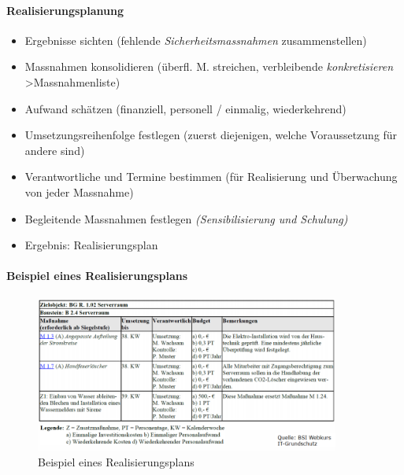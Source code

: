 \documentclass[10pt,a4paper]{article}
\begin{document}
\paragraph*{Realisierungsplanung}
\begin{itemize}[noitemsep,topsep=0pt,leftmargin=*]
    \item Ergebnisse sichten (fehlende
    \textsl{Sicherheitsmassnahmen} zusammenstellen)
    \item Massnahmen konsolidieren (überfl. M. streichen,
    verbleibende \textsl{konkretisieren} \textgreater Massnahmenliste)
    \item Aufwand schätzen (finanziell, personell /
    einmalig, wiederkehrend)
    \item Umsetzungsreihenfolge festlegen (zuerst diejenigen, welche Voraussetzung für andere sind)
    \item Verantwortliche und Termine bestimmen (für
    Realisierung und Überwachung von jeder
    Massnahme)
    \item Begleitende Massnahmen festlegen
    \textsl{(Sensibilisierung und Schulung)}
    \item Ergebnis: Realisierungsplan
\end{itemize}

\paragraph*{Beispiel eines Realisierungsplans}

\begin{figure}[H]
    \begin{center}
    \includegraphics[width=10cm]{images/Beispiel eines Realisierungsplans.png}
    \caption{Beispiel eines Realisierungsplans}
    \label{Beispiel eines Realisierungsplans}
    \end{center}
\end{figure}
\end{document}
